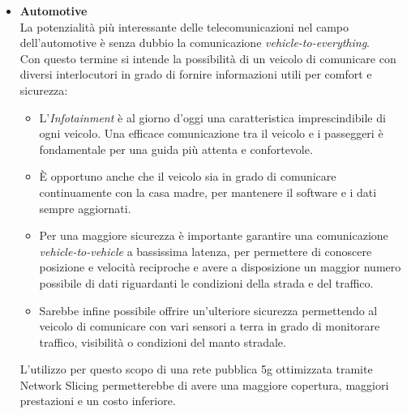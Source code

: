\begin{itemize}
	\item \textbf{Automotive}\\
	La potenzialità più interessante delle telecomunicazioni nel campo dell'automotive è senza dubbio la comunicazione \textit{vehicle-to-everything}.\\
	Con questo termine si intende la possibilità di un veicolo di comunicare con diversi interlocutori in grado di fornire informazioni utili per comfort e sicurezza:
	\begin{itemize}
		\item L'\textit{Infotainment} è al giorno d'oggi una caratteristica imprescindibile di ogni veicolo. Una efficace comunicazione tra il veicolo e i passeggeri è fondamentale per una guida più attenta e confortevole.
		\item È opportuno anche che il veicolo sia in grado di comunicare continuamente con la casa madre, per mantenere il software e i dati sempre aggiornati.
		\item Per una maggiore sicurezza è importante garantire una comunicazione \textit{vehicle-to-vehicle} a bassissima latenza, per permettere di conoscere posizione e velocità reciproche e avere a disposizione un maggior numero possibile di dati riguardanti le condizioni della strada e del traffico.
		\item Sarebbe infine possibile offrire un'ulteriore sicurezza permettendo al veicolo di comunicare con vari sensori a terra in grado di monitorare traffico, visibilità o condizioni del manto stradale.
	\end{itemize}
	L'utilizzo per questo scopo di una rete pubblica 5g ottimizzata tramite Network Slicing permetterebbe di avere una maggiore copertura, maggiori prestazioni e un costo inferiore.
	

\end{itemize}
